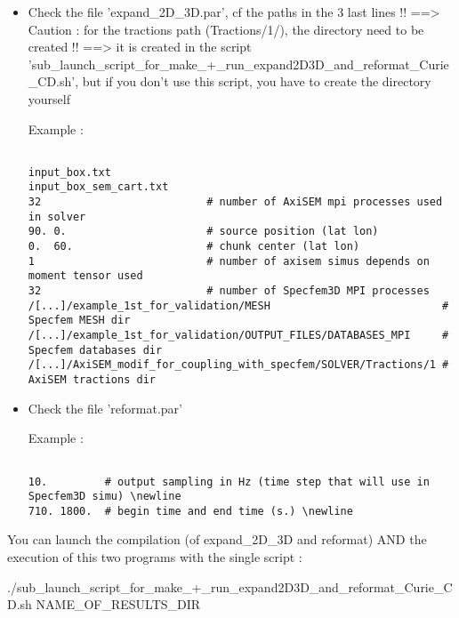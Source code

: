 \documentclass[11pt]{article}
\begin{document}
\begin{itemize}

\item[\textbullet] Check the file 'expand\_2D\_3D.par', cf the paths in the 3 last lines !! ==> Caution : for the tractions path (Tractions/1/), the directory need to be created !! ==> it is created in the script 'sub\_launch\_script\_for\_make\_+\_run\_expand2D3D\_and\_reformat\_Curie\_CD.sh', but if you don't use this script, you have to create the directory yourself

\smallskip

\noindent Example :
\begin{verbatim}

input_box.txt
input_box_sem_cart.txt
32                          # number of AxiSEM mpi processes used in solver
90. 0.                      # source position (lat lon)
0.  60.                     # chunk center (lat lon)
1                           # number of axisem simus depends on moment tensor used
32                          # number of Specfem3D MPI processes
/[...]/example_1st_for_validation/MESH                           # Specfem MESH dir
/[...]/example_1st_for_validation/OUTPUT_FILES/DATABASES_MPI     # Specfem databases dir
/[...]/AxiSEM_modif_for_coupling_with_specfem/SOLVER/Tractions/1 # AxiSEM tractions dir

\end{verbatim}

\item[\textbullet] Check the file 'reformat.par'

\smallskip

\noindent Example :
\begin{verbatim}

10.         # output sampling in Hz (time step that will use in Specfem3D simu) \newline
710. 1800.  # begin time and end time (s.) \newline

\end{verbatim}

\end{itemize}

\medskip

\noindent You can launch the compilation (of expand\_2D\_3D and reformat) AND the execution of this two programs with the single script :

\smallskip

\noindent ./sub\_launch\_script\_for\_make\_+\_run\_expand2D3D\_and\_reformat\_Curie\_CD.sh NAME\_OF\_RESULTS\_DIR
\end{document}
